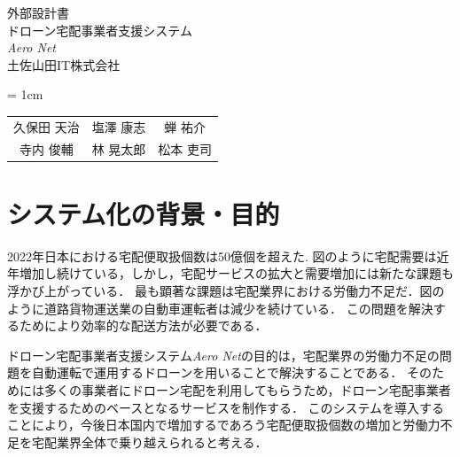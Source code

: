 \documentclass[a4paper, titlepage]{jsarticle}
\date{\today}
\newcommand{\system}{\textsl{Aero Net}}
\begin{document}
\begin{titlepage}
  \centering
  \vspace*{150truept}
  {\Large 外部設計書}\\
  \vspace*{50truept}
  {\Huge ドローン宅配事業者支援システム} \\
  \vspace{15truept}
  {\Huge \system} \\
  \vspace{50truept}
  {\LARGE 土佐山田IT株式会社}\\
  \vspace{20truept}
  {\large{\tabcolsep = 1cm
      \begin{tabular}{ccc}
        久保田 天治 & 塩澤 康志 & 蝉 祐介  \\
        寺内 俊輔  & 林 晃太郎 & 松本 吏司
      \end{tabular}
    }}
\end{titlepage}
\newcommand{\fig}[2]{
  \begin{figure}[H]
    \centering
    \texttt{[image: flow/\#1.pdf]}
    \caption{#2}
    \label{fig:#1}
  \end{figure}
}
\newcommand{\ui}[2]{
  \begin{figure}[H]
    \centering
    \texttt{[image: ui/\#1]}
    \caption{#2}
    \label{fig:#1}
  \end{figure}
}

\tableofcontents

\clearpage

\section{システム化の背景・目的}
2022年日本における宅配便取扱個数は50億個を超えた.
図のように宅配需要は近年増加し続けている，しかし，宅配サービスの拡大と需要増加には新たな課題も浮かび上がっている．
最も顕著な課題は宅配業界における労働力不足だ．図のように道路貨物運送業の自動車運転者は減少を続けている．
この問題を解決するためにより効率的な配送方法が必要である．

ドローン宅配事業者支援システム\system の目的は，宅配業界の労働力不足の問題を自動運転で運用するドローンを用いることで解決することである．
そのためには多くの事業者にドローン宅配を利用してもらうため，ドローン宅配事業者を支援するためのベースとなるサービスを制作する．
このシステムを導入することにより，今後日本国内で増加するであろう宅配便取扱個数の増加と労働力不足を宅配業界全体で乗り越えられると考える．
\end{document}
